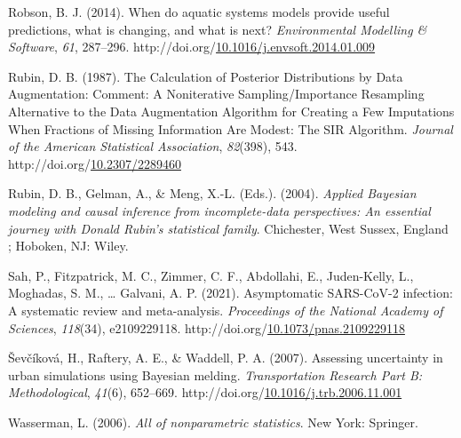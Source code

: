 \documentclass[12pt,twoside]{smiththesis}
\newlength{\cslhangindent}
\newenvironment{CSLReferences}[2] %
 {%
\setlength{\parindent}{0pt}
\ifodd #1 \everypar{\setlength{\hangindent}{\cslhangindent}}\ignorespaces\fi
\ifnum #2 > 0
\setlength{\parskip}{#2\baselineskip}
  \fi
}%
{}
\begin{document}
\begin{CSLReferences}{1}{0}
\leavevmode{}%
Robson, B. J. (2014). When do aquatic systems models provide useful predictions, what is changing, and what is next? \emph{Environmental Modelling \& Software}, \emph{61}, 287--296. http://doi.org/\href{https://doi.org/10.1016/j.envsoft.2014.01.009}{10.1016/j.envsoft.2014.01.009}

\leavevmode{}%
Rubin, D. B. (1987). The {Calculation} of {Posterior Distributions} by {Data Augmentation}: {Comment}: {A Noniterative Sampling}/{Importance Resampling Alternative} to the {Data Augmentation Algorithm} for {Creating} a {Few Imputations When Fractions} of {Missing Information Are Modest}: {The SIR Algorithm}. \emph{Journal of the American Statistical Association}, \emph{82}(398), 543. http://doi.org/\href{https://doi.org/10.2307/2289460}{10.2307/2289460}

\leavevmode{}%
Rubin, D. B., Gelman, A., \& Meng, X.-L. (Eds.). (2004). \emph{Applied {Bayesian} modeling and causal inference from incomplete-data perspectives: An essential journey with {Donald Rubin}'s statistical family}. {Chichester, West Sussex, England ; Hoboken, NJ}: {Wiley}.

\leavevmode{}%
Sah, P., Fitzpatrick, M. C., Zimmer, C. F., Abdollahi, E., Juden-Kelly, L., Moghadas, S. M., \ldots{} Galvani, A. P. (2021). Asymptomatic {SARS-CoV-2} infection: {A} systematic review and meta-analysis. \emph{Proceedings of the National Academy of Sciences}, \emph{118}(34), e2109229118. http://doi.org/\href{https://doi.org/10.1073/pnas.2109229118}{10.1073/pnas.2109229118}

\leavevmode{}%
Ševčíková, H., Raftery, A. E., \& Waddell, P. A. (2007). Assessing uncertainty in urban simulations using {Bayesian} melding. \emph{Transportation Research Part B: Methodological}, \emph{41}(6), 652--669. http://doi.org/\href{https://doi.org/10.1016/j.trb.2006.11.001}{10.1016/j.trb.2006.11.001}

\leavevmode{}%
Wasserman, L. (2006). \emph{All of nonparametric statistics}. {New York}: {Springer}.

\end{CSLReferences}

\end{document}
